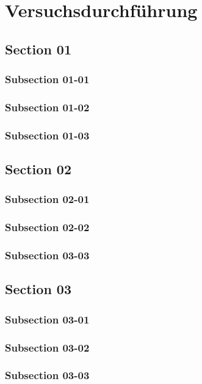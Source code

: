 \chapter{Versuchsdurchführung}

\bt 

\section{Section 01}
\bt
\subsection{Subsection 01-01}
\bt
\subsection{Subsection 01-02}
\bt 
\subsection{Subsection 01-03}

\section{Section 02}
\bt
\subsection{Subsection 02-01}
\bt
\subsection{Subsection 02-02}
\bt
\subsection{Subsection 03-03}
\bt

\section{Section 03}
\bt
\subsection{Subsection 03-01}
\bt
\subsection{Subsection 03-02}
\bt
\subsection{Subsection 03-03}
\bt
